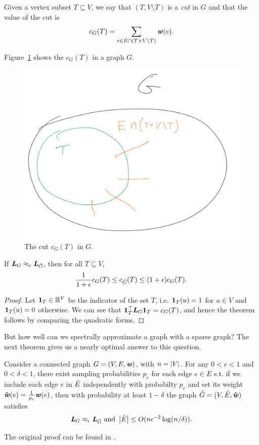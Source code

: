 Given a vertex subset $T \subseteq V$, we say that $(T, V\setminus T)$
is a \emph{cut} in $G$ and that the value of the cut is
\[
  c_G(T) = \sum_{e \in E \cap (T \times V\setminus T) } \boldsymbol{\mathit{w}}(e)
.
\]

Figure~\ref{fig:cutexample} shows the $c_G(T)$ in a graph $G$.
\begin{figure}[h]
  \centering
  \includegraphics[width=0.4
  \textwidth]{fig/lecture8_cutvalue}
\caption{The cut $c_G(T)$ in $G$.}
\label{fig:cutexample}
\end{figure}


\begin{theorem}
  If $\boldsymbol{\mathit{L}}_{G} \approx_{\epsilon} \boldsymbol{\mathit{L}}_{\tilde{G}}$, then for all $T \subseteq V$,
  \[
    \frac{1}{1+\epsilon}   c_G(T) \leq   c_{\tilde{G}}(T) \leq (1+\epsilon)   c_G(T)
    .
    \]
\end{theorem}
\begin{proof}
  Let $\boldsymbol{1}_T \in \mathbb{R}^V$ be the indicator of the set $T$,
  i.e. $\boldsymbol{1}_T(u) = 1$ for $u \in V$ and $\boldsymbol{1}_T(u) = 0$
  otherwise.
  We can see that $\boldsymbol{1}_T^{\top} \boldsymbol{\mathit{L}}_{G} \boldsymbol{1}_T =  c_G(T)$, and
  hence the theorem follows by comparing the quadratic forms.
\end{proof}

But how well can we spectrally approximate a graph with a sparse graph? The next
theorem gives us a nearly optimal answer to this question.
\begin{theorem}
  \label{thm:spectralgraphapxbysamp}
Consider a connected graph $G = (V,E,\boldsymbol{\mathit{w}})$, with $n = \left|V \right|$.
For any $0 < \epsilon < 1$
and $0 < \delta < 1$, there exist sampling probabilities $p_e$ for
each edge $e \in E$ s.t. if we include each edge $e$ in $\tilde{E}$
independently with probabilty $p_e$ and set its weight $\boldsymbol{\tilde{\mathit{w}}}(e) =
\frac{1}{p_e} \boldsymbol{\mathit{w}}(e)$, then with probability at least $1-\delta$
the graph $\tilde{G} = (V,\tilde{E},\boldsymbol{\tilde{\mathit{w}}})$ satisfies
\[
  \boldsymbol{\mathit{L}}_{G} \approx_{\epsilon} \boldsymbol{\mathit{L}}_{\tilde{G}} \text{ and }  \left|\tilde{E} \right|
  \leq O( n \epsilon^{-2} \log(n/\delta) )
.
\]
\end{theorem}
The original proof can be found in \cite{spielman2011graph}.


